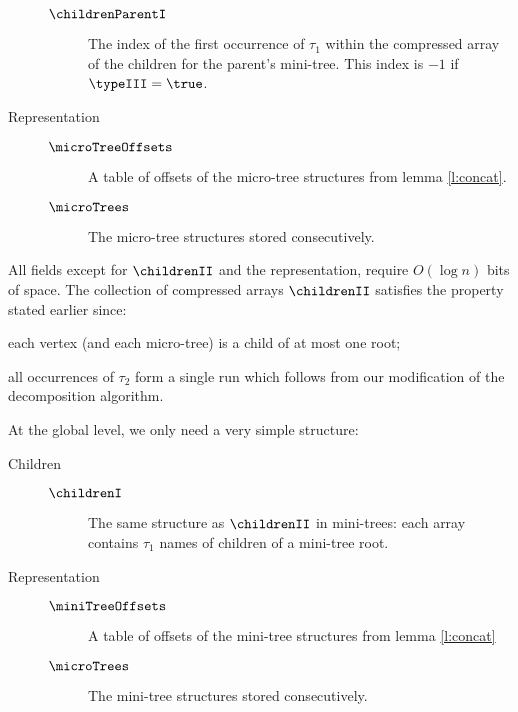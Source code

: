\begin{description}
\begin{description}
		\item[$\childrenParentI$]
		The index of the first occurrence of $\tau_1$ within the compressed array of the children for the parent's mini-tree.
		This index is $-1$ if $\typeIII = \true$.
	\end{description}
	
	\item[Representation]
	\begin{description}
		\item[]
	
		\item[$\microTreeOffsets$]
		A table of offsets of the micro-tree structures from lemma \ref{l:concat}.
		
		\item[$\microTrees$]
		The micro-tree structures stored consecutively.
	\end{description}
\end{description}

All fields except for $\childrenII$ and the representation, require $O(\log n)$ bits of space.
The collection of compressed arrays $\childrenII$ satisfies the property stated earlier since:
\begin{enuminline}
	\item each vertex (and each micro-tree) is a child of at most one root;
	\item all occurrences of $\tau_2$ form a single run which follows from our modification of the decomposition algorithm.
\end{enuminline}

\bigbreak

At the global level, we only need a very simple structure:
\begin{description}
	\item[Children]
	\begin{description}
		\item[]
		\item[$\childrenI$]
		The same structure as $\childrenII$ in mini-trees: each array contains $\tau_1$ names of children of a mini-tree root.
	\end{description}

	\item[Representation]
	\begin{description}
		\item[]
	
		\item[$\miniTreeOffsets$]
		A table of offsets of the mini-tree structures from lemma \ref{l:concat}
		
		\item[$\microTrees$]
		The mini-tree structures stored consecutively.
	\end{description}
\end{description}

